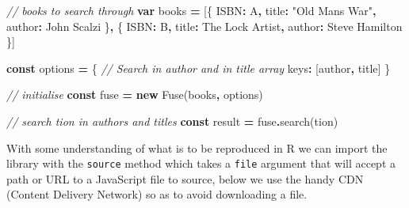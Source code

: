 \documentclass[
]{krantz}
\makeatletter
\newenvironment{Shaded}{\begin{snugshade}}{\end{snugshade}}
\newcommand{\CommentTok}[1]{\textcolor[rgb]{0.37,0.37,0.37}{\textit{#1}}}
\newcommand{\DataTypeTok}[1]{\textcolor[rgb]{0.27,0.27,0.27}{#1}}
\newcommand{\FunctionTok}[1]{\textcolor[rgb]{0,0,0}{#1}}
\newcommand{\KeywordTok}[1]{\textcolor[rgb]{0.27,0.27,0.27}{\textbf{#1}}}
\newcommand{\NormalTok}[1]{#1}
\newcommand{\OperatorTok}[1]{\textcolor[rgb]{0.43,0.43,0.43}{\textbf{#1}}}
\newcommand{\StringTok}[1]{\textcolor[rgb]{0.5,0.5,0.5}{#1}}
\newenvironment{kframe}{%
\medskip{}
\setlength{\fboxsep}{.8em}
 \def\at@end@of@kframe{}%
 \ifinner\ifhmode%
  \def\at@end@of@kframe{\end{minipage}}%
  \begin{minipage}{\columnwidth}%
 \fi\fi%
 \def\FrameCommand##1{\hskip\@totalleftmargin \hskip-\fboxsep
 \colorbox{shadecolor}{##1}\hskip-\fboxsep
     \hskip-\linewidth \hskip-\@totalleftmargin \hskip\columnwidth}%
 \MakeFramed {\advance\hsize-\width
   \@totalleftmargin\z@ \linewidth\hsize
   \@setminipage}}%
 {\par\unskip\endMakeFramed%
 \at@end@of@kframe}
\renewenvironment{Shaded}{\begin{kframe}}{\end{kframe}}
\makeatother
\begin{document}
\begin{Shaded}
\begin{Highlighting}[]
\CommentTok{// books to search through}
\KeywordTok{var}\NormalTok{ books }\OperatorTok{=}\NormalTok{ [\{}
  \StringTok{\textquotesingle{}ISBN\textquotesingle{}}\OperatorTok{:} \StringTok{\textquotesingle{}A\textquotesingle{}}\OperatorTok{,}
  \StringTok{\textquotesingle{}title\textquotesingle{}}\OperatorTok{:} \StringTok{"Old Man\textquotesingle{}s War"}\OperatorTok{,}
  \StringTok{\textquotesingle{}author\textquotesingle{}}\OperatorTok{:} \StringTok{\textquotesingle{}John Scalzi\textquotesingle{}}
\NormalTok{\}}\OperatorTok{,}\NormalTok{ \{}
  \StringTok{\textquotesingle{}ISBN\textquotesingle{}}\OperatorTok{:} \StringTok{\textquotesingle{}B\textquotesingle{}}\OperatorTok{,}
  \StringTok{\textquotesingle{}title\textquotesingle{}}\OperatorTok{:} \StringTok{\textquotesingle{}The Lock Artist\textquotesingle{}}\OperatorTok{,}
  \StringTok{\textquotesingle{}author\textquotesingle{}}\OperatorTok{:} \StringTok{\textquotesingle{}Steve Hamilton\textquotesingle{}}
\NormalTok{\}]}

\KeywordTok{const}\NormalTok{ options }\OperatorTok{=}\NormalTok{ \{}
  \CommentTok{// Search in \textasciigrave{}author\textasciigrave{} and in \textasciigrave{}title\textasciigrave{} array}
  \DataTypeTok{keys}\OperatorTok{:}\NormalTok{ [}\StringTok{\textquotesingle{}author\textquotesingle{}}\OperatorTok{,} \StringTok{\textquotesingle{}title\textquotesingle{}}\NormalTok{]}
\NormalTok{\}}

\CommentTok{// initialise}
\KeywordTok{const}\NormalTok{ fuse }\OperatorTok{=} \KeywordTok{new}\NormalTok{ Fuse(books}\OperatorTok{,}\NormalTok{ options)}

\CommentTok{// search \textquotesingle{}tion\textquotesingle{} in authors and titles}
\KeywordTok{const}\NormalTok{ result }\OperatorTok{=}\NormalTok{ fuse}\OperatorTok{.}\FunctionTok{search}\NormalTok{(}\StringTok{\textquotesingle{}tion\textquotesingle{}}\NormalTok{)}
\end{Highlighting}
\end{Shaded}

With some understanding of what is to be reproduced in R we can import the library with the \texttt{source} method which takes a \texttt{file} argument that will accept a path or URL to a JavaScript file to source, below we use the handy CDN (Content Delivery Network) so as to avoid downloading a file.

\begin{Shaded}
\end{Shaded}
\end{document}
